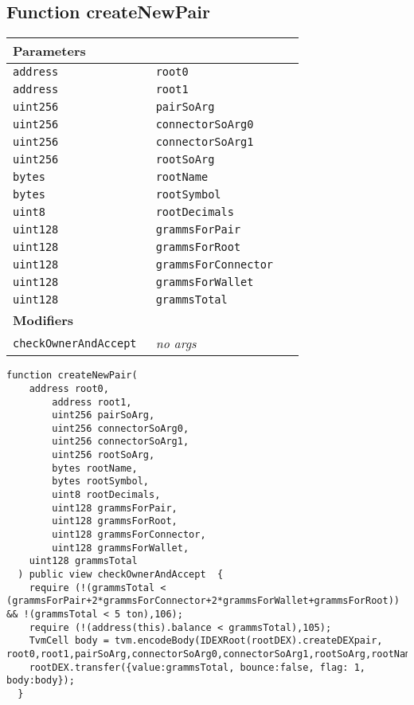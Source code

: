 \subsection{Function createNewPair}


\ifsoltables
\noindent\begin{tabular}{|l|l|p{5cm}|}\hline
\multicolumn{3}{|l|}{\bf Parameters}\\\hline
\tt address & \tt root0 &\\\hline
\tt address & \tt root1 &\\\hline
\tt uint256 & \tt pairSoArg &\\\hline
\tt uint256 & \tt connectorSoArg0 &\\\hline
\tt uint256 & \tt connectorSoArg1 &\\\hline
\tt uint256 & \tt rootSoArg &\\\hline
\tt bytes & \tt rootName &\\\hline
\tt bytes & \tt rootSymbol &\\\hline
\tt uint8 & \tt rootDecimals &\\\hline
\tt uint128 & \tt grammsForPair &\\\hline
\tt uint128 & \tt grammsForRoot &\\\hline
\tt uint128 & \tt grammsForConnector &\\\hline
\tt uint128 & \tt grammsForWallet &\\\hline
\tt uint128 & \tt grammsTotal &\\\hline
\multicolumn{3}{|l|}{\bf Modifiers}\\\hline
\tt checkOwnerAndAccept & {\em no args} &\\\hline
\end{tabular}
\fi

\vspace{2cm}

\begin{lstlisting}[firstnumber=356]
  function createNewPair(
    address root0,
		address root1,
		uint256 pairSoArg,
		uint256 connectorSoArg0,
		uint256 connectorSoArg1,
		uint256 rootSoArg,
		bytes rootName,
		bytes rootSymbol,
		uint8 rootDecimals,
		uint128 grammsForPair,
		uint128 grammsForRoot,
		uint128 grammsForConnector,
		uint128 grammsForWallet,
    uint128 grammsTotal
  ) public view checkOwnerAndAccept  {
    require (!(grammsTotal < (grammsForPair+2*grammsForConnector+2*grammsForWallet+grammsForRoot)) && !(grammsTotal < 5 ton),106);
    require (!(address(this).balance < grammsTotal),105);
    TvmCell body = tvm.encodeBody(IDEXRoot(rootDEX).createDEXpair, root0,root1,pairSoArg,connectorSoArg0,connectorSoArg1,rootSoArg,rootName,rootSymbol,rootDecimals,grammsForPair,grammsForRoot,grammsForConnector,grammsForWallet);
    rootDEX.transfer({value:grammsTotal, bounce:false, flag: 1, body:body});
  }
\end{lstlisting}


